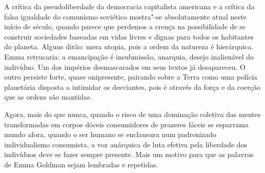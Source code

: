 A crítica da pseudoliberdade da democracia capitalista americana e a
crítica da falsa igualdade do comunismo soviético mostra"-se
absolutamente atual neste início de século, quando parece que perdemos
a crença na possibilidade de se construir sociedades baseadas em vidas
livres e dignas para todos os habitantes do planeta. Alguns dirão: mera
utopia, pois a ordem da natureza é hierárquica. Emma retrucaria: a
emancipação é insubmissão, anarquia, desejo inalienável do indivíduo.
Um dos impérios desmascarados em seus textos já desapareceu. O outro
persiste forte, quase onipresente, pairando sobre a Terra como uma
polícia planetária disposta a intimidar os desviantes, pois é através
da força e da coerção que as ordens são mantidas. 

Agora, mais do que nunca, quando o risco de uma dominação coletiva das
mentes transformadas em corpos dóceis consumidores de prazeres fáceis
se esparrama mundo afora, quando o ser humano se enclausura num
padronizado individualismo consumista, a voz anárquica de luta efetiva
pela liberdade dos indivíduos deve se fazer sempre presente. Mais um
motivo para que as palavras de Emma Goldman sejam lembradas e repetidas.
